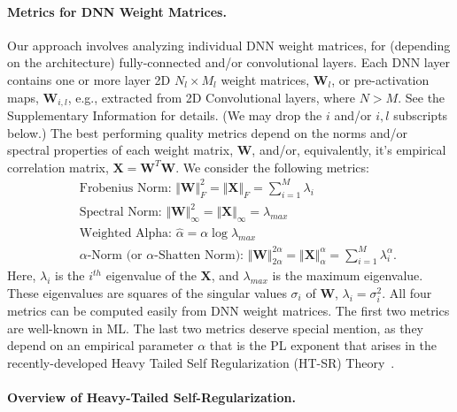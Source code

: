 \paragraph{Metrics for DNN Weight Matrices.}

Our approach involves analyzing individual DNN weight matrices, for (depending on the architecture) fully-connected and/or convolutional layers.
Each DNN layer contains one or more layer 2D  $N_{l}\times M_{l}$ weight matrices, $\mathbf{W}_{l}$, or pre-activation maps, $\mathbf{W}_{i,l}$, e.g., extracted from 2D Convolutional layers, where $N > M$.
See the Supplementary Information
for details.
(We may drop the $i$ and/or $i,l$ subscripts below.)
The best performing quality metrics depend on the norms and/or spectral properties of each weight matrix,
$\mathbf{W}$, and/or, equivalently, it's empirical correlation matrix, $\mathbf{X}=\mathbf{W}^{T}\mathbf{W}$.
We consider the following metrics:
\begin{eqnarray}
& & \text{Frobenius Norm: $\Vert\mathbf{W}\Vert^{2}_{F}=\Vert\mathbf{X}\Vert_{F}=\sum\nolimits_{i=1}^{M} \lambda_{i}$ } \\
& & \text{Spectral Norm: $\Vert\mathbf{W}\Vert_{\infty}^{2}=\Vert\mathbf{X}\Vert_{\infty}=\lambda_{max}$ } \\
& & \text{Weighted Alpha: $\hat{\alpha}=\alpha\log\lambda_{max}$ } \\
& & \text{$\alpha$-Norm (or $\alpha$-Shatten Norm): $\Vert\mathbf{W}\Vert^{2\alpha}_{2\alpha}=\Vert\mathbf{X}\Vert^{\alpha}_{\alpha}=\sum\nolimits_{i=1}^{M}\lambda_{i}^{\alpha}$. }
\end{eqnarray}
Here, $\lambda_{i}$ is the $i^{th}$ eigenvalue of the $\mathbf{X}$, and $\lambda_{max}$ is the maximum eigenvalue.
These eigenvalues are squares of the singular values $\sigma_{i}$ of $\mathbf{W}$, $\lambda_{i}=\sigma^{2}_{i}$.
All four metrics can be computed easily from DNN weight matrices.
The first two metrics are well-known in ML.
The last two metrics deserve special mention, as they depend on an empirical parameter $\alpha$ that is the PL exponent that arises in the recently-developed Heavy Tailed Self Regularization (HT-SR) Theory~\cite{MM18_TR, MM19_HTSR_ICML, MM20_SDM}.


\paragraph{Overview of Heavy-Tailed Self-Regularization.}

